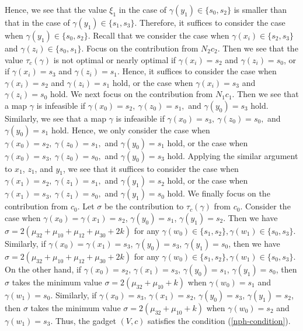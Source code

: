 \documentclass[11pt]{article}
\theoremstyle{definition}
\begin{document}
Hence, we see that the value $\xi_1$ in the case of $\gamma(y_1)\in \{s_0,s_2\}$ is smaller than that in the case of $\gamma(y_1)\in \{s_1,s_3\}$. Therefore, it suffices to consider the case when $\gamma(y_1)\in \{s_0,s_2\}$. Recall that we consider the case when $\gamma(x_i)\in \{s_2,s_3\}$ and $\gamma(z_i)\in \{s_0,s_1\}$. Focus on the contribution from $N_2c_2$. Then we see that the value $\tau_{c}(\gamma)$ is not optimal or nearly optimal if $\gamma(x_i)=s_2$ and $\gamma(z_i)=s_0$, or if $\gamma(x_i)=s_3$ and $\gamma(z_i)=s_1$. Hence, it suffices to consider the case when $\gamma(x_i)=s_2$ and $\gamma(z_i)=s_1$ hold, or the case when $\gamma(x_i)=s_3$ and $\gamma(z_i)=s_0$ hold. We next focus on the contribution from $N_1c_1$. Then we see that a map $\gamma$ is infeasible if $\gamma(x_0)=s_2,\ \gamma(z_0)=s_1,$ and $\gamma(y_0)=s_3$ hold. Similarly, we see that a map $\gamma$ is infeasible if $\gamma(x_0)=s_3,\ \gamma(z_0)=s_0,$ and $\gamma(y_0)=s_1$ hold. Hence, we only consider the case when $\gamma(x_0)=s_2,\ \gamma(z_0)=s_1,$ and $\gamma(y_0)=s_1$ hold, or the case when $\gamma(x_0)=s_3,\ \gamma(z_0)=s_0,$ and $\gamma(y_0)=s_3$ hold. Applying the similar argument to $x_1$, $z_1$, and $y_1$, we see that it suffices to consider the case when $\gamma(x_1)=s_2,\ \gamma(z_1)=s_1,$ and $\gamma(y_1)=s_2$ hold, or the case when $\gamma(x_1)=s_3,\ \gamma(z_1)=s_0,$ and $\gamma(y_1)=s_0$ hold. We finally focus on the contribution from $c_0$. Let $\sigma$ be the contribution to $\tau_{c}(\gamma)$ from $c_0$. Consider the case when $\gamma(x_0)=\gamma(x_1)=s_2$, $\gamma(y_0)=s_1$, $\gamma(y_1)=s_2$. Then we have $\sigma=2(\mu_{32}+\mu_{10}+\mu_{12}+\mu_{30}+2k)$ for any $\gamma(w_0)\in \{s_1,s_2\},\gamma(w_1)\in \{s_0,s_3\}$. Similarly, if $\gamma(x_0)=\gamma(x_1)=s_3$, $\gamma(y_0)=s_3$, $\gamma(y_1)=s_0$, then we have $\sigma=2(\mu_{32}+\mu_{10}+\mu_{12}+\mu_{30}+2k)$ for any $\gamma(w_0)\in \{s_1,s_2\},\gamma(w_1)\in \{s_0,s_3\}$. On the other hand, if $\gamma(x_0)=s_2$, $\gamma(x_1)=s_3$, $\gamma(y_0)=s_1$, $\gamma(y_1)=s_0$, then $\sigma$ takes the minimum value $\sigma=2(\mu_{32}+\mu_{10}+k)$ when $\gamma(w_0)=s_1$ and $\gamma(w_1)=s_0$. Similarly, if $\gamma(x_0)=s_3$, $\gamma(x_1)=s_2$, $\gamma(y_0)=s_3$, $\gamma(y_1)=s_2$, then $\sigma$ takes the minimum value $\sigma=2(\mu_{32}+\mu_{10}+k)$ when $\gamma(w_0)=s_2$ and $\gamma(w_1)=s_3$. Thus, the gadget $(V,c)$ satisfies the condition (\ref{nph-condition}).
\end{document}
